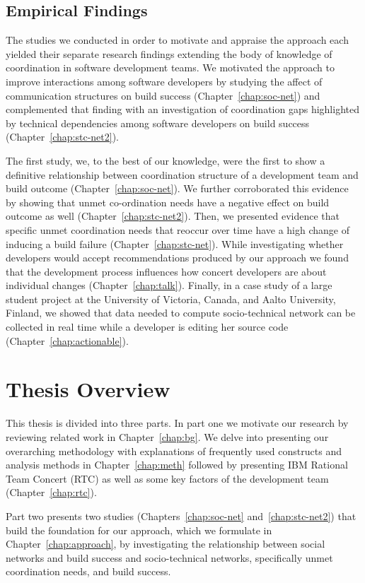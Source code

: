 \subsection{Empirical Findings}
The studies we conducted in order to motivate and appraise the approach each yielded their separate research findings extending the body of knowledge of coordination in software development teams.
We motivated the approach to improve interactions among software developers by studying the affect of communication structures on build success (Chapter~\ref{chap:soc-net}) and complemented that finding with an investigation of coordination gaps highlighted by technical dependencies among software developers on build success (Chapter~\ref{chap:stc-net2}).

The first study, we, to the best of our knowledge, were the first to show a definitive relationship between coordination structure of a development team and build outcome (Chapter~\ref{chap:soc-net}).
We further corroborated this evidence by showing that unmet co-ordination needs have a negative effect on build outcome as well (Chapter~\ref{chap:stc-net2}).
Then, we presented evidence that specific unmet coordination needs that reoccur over time have a high change of inducing a build failure (Chapter~\ref{chap:stc-net}).
While investigating whether developers would accept recommendations produced by our approach we found that the development process influences how concert developers are about individual changes (Chapter~\ref{chap:talk}).
Finally, in a case study of a large student project at the University of Victoria, Canada, and Aalto University, Finland, we showed that data needed to compute socio-technical network can be collected in real time while a developer is editing her source code (Chapter~\ref{chap:actionable}).

\section{Thesis Overview}
This thesis is divided into three parts.
In part one we motivate our research by reviewing related work in Chapter~\ref{chap:bg}.
We delve into presenting our overarching methodology with explanations of frequently used constructs and analysis methods in Chapter~\ref{chap:meth} followed by presenting IBM Rational Team Concert (RTC) as well as some key factors of the development team (Chapter~\ref{chap:rtc}).

Part two presents two studies (Chapters~\ref{chap:soc-net} and~\ref{chap:stc-net2}) that build the foundation for our approach, which we formulate in Chapter~\ref{chap:approach}, by investigating the relationship between social networks and build success and socio-technical networks, specifically unmet coordination needs, and build success.


